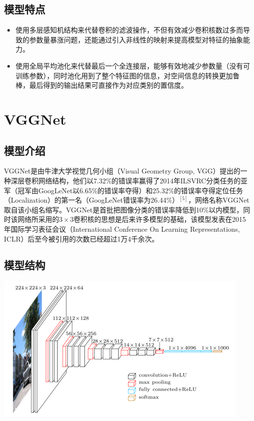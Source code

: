 \documentclass[12pt,a4paper,UTF8,twoside]{book}
\begin{document}
\hypertarget{ux6a21ux578bux7279ux70b9}{%
\subsection{模型特点}\label{ux6a21ux578bux7279ux70b9}}

\begin{itemize}
\item
  使用多层感知机结构来代替卷积的滤波操作，不但有效减少卷积核数过多而导致的参数量暴涨问题，还能通过引入非线性的映射来提高模型对特征的抽象能力。
\item
  使用全局平均池化来代替最后一个全连接层，能够有效地减少参数量（没有可训练参数），同时池化用到了整个特征图的信息，对空间信息的转换更加鲁棒，最后得到的输出结果可直接作为对应类别的置信度。
\end{itemize}

\hypertarget{vggnet}{%
\section{VGGNet}\label{vggnet}}

\hypertarget{ux6a21ux578bux4ecbux7ecd-4}{%
\subsection{模型介绍}\label{ux6a21ux578bux4ecbux7ecd-4}}

\hspace{0pt}VGGNet是由牛津大学视觉几何小组（Visual Geometry Group, VGG）提出的一种深层卷积网络结构，他们以7.32\%的错误率赢得了2014年ILSVRC分类任务的亚军（冠军由GoogLeNet以6.65\%的错误率夺得）和25.32\%的错误率夺得定位任务（Localization）的第一名（GoogLeNet错误率为26.44\%）\(^{[5]}\)，网络名称VGGNet取自该小组名缩写。VGGNet是首批把图像分类的错误率降低到10\%以内模型，同时该网络所采用的\(3\times3\)卷积核的思想是后来许多模型的基础，该模型发表在2015年国际学习表征会议（International Conference On Learning Representations, ICLR）后至今被引用的次数已经超过1万4千余次。

\hypertarget{ux6a21ux578bux7ed3ux6784-4}{%
\subsection{模型结构}\label{ux6a21ux578bux7ed3ux6784-4}}

\begin{center}\includegraphics[width=0.7\linewidth]{img/02-08} \end{center}
\end{document}
